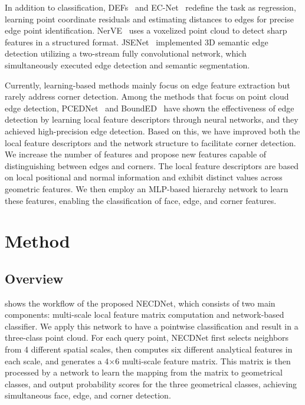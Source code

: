 \documentclass[lettersize,journal]{IEEEtran}
\begin{document}
In addition to classification, DEFs~\cite{matveev_def_2022} and EC-Net~\cite{yu_ecnet_2018} redefine the task as regression, learning point coordinate residuals and estimating distances to edges for precise edge point identification. NerVE~\cite{zhu_nerve_2023} uses a voxelized point cloud to detect sharp features in a structured format. JSENet~\cite{hu_jsenet_2020} implemented 3D semantic edge detection utilizing a two-stream fully convolutional network, which simultaneously executed edge detection and semantic segmentation.

Currently, learning-based methods mainly focus on edge feature extraction but rarely address corner detection. Among the methods that focus on point cloud edge detection, PCEDNet~\cite{himeur_pcednet_2022} and BoundED~\cite{bode_bounded_2023} have shown the effectiveness of edge detection by learning local feature descriptors through neural networks, and they achieved high-precision edge detection. Based on this, we have improved both the local feature descriptors and the network structure to facilitate corner detection. We increase the number of features and propose new features capable of distinguishing between edges and corners.
The local feature descriptors are based on local positional and normal information and exhibit distinct values across geometric features. We then employ an MLP-based hierarchy network to learn these features, enabling the classification of face, edge, and corner features.

\section{Method}
\label{sec:method}

\subsection{Overview}
 shows the workflow of the proposed NECDNet, which consists of two main components: multi-scale local feature matrix computation and network-based classifier. 
We apply this network to have a pointwise classification and result in a three-class point cloud.
For each query point, NECDNet first selects neighbors from 4 different spatial scales, then computes six different analytical features in each scale, and generates a 4$\times$6 multi-scale feature matrix. This matrix is then processed by a network to learn the mapping from the matrix to geometrical classes, and output probability scores for the three geometrical classes, achieving simultaneous face, edge, and corner detection.
\end{document}
